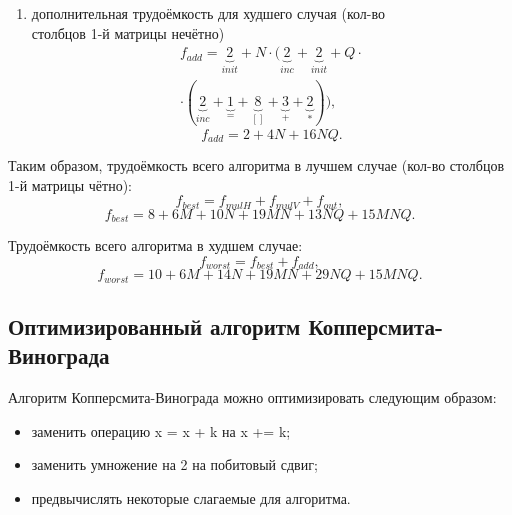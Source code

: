 \begin{enumerate}
	\item дополнительная трудоёмкость для худшего случая (кол-во\\
		столбцов 1-й матрицы нечётно)
	\begin{equation}
	\begin{gathered}
		f_{add} = \underbrace{2}_{init} + N \cdot (\underbrace{2}_{inc} + \underbrace{2}_{init} + Q \cdot \\
		\cdot (\underbrace{2}_{inc} + \underbrace{1}_{=} + \underbrace{8}_{[]} + \underbrace{3}_{+} + \underbrace{2}_{*})),
	\end{gathered}
	\end{equation}
	\begin{equation}
		f_{add} = 2 + 4N + 16NQ.
	\end{equation}
\end{enumerate}

\clearpage
Таким образом, трудоёмкость всего алгоритма в лучшем случае (кол-во столбцов 1-й матрицы чётно):
\begin{equation}
	f_{best} = f_{mulH} + f_{mulV} + f_{out},
\end{equation}
\begin{equation}
	f_{best} = 8 + 6M + 10N + 19MN + 13 NQ + 15 MNQ.
\end{equation}

Трудоёмкость всего алгоритма в худшем случае:
\begin{equation}
	f_{worst} = f_{best} + f_{add},
\end{equation}
\begin{equation}
	f_{worst} = 10 + 6M + 14N + 19MN + 29NQ + 15 MNQ.
\end{equation}

\subsection{Оптимизированный алгоритм \newline Копперсмита-Винограда}

Алгоритм Копперсмита-Винограда можно оптимизировать следующим образом:
\begin{itemize}
	\item заменить операцию x = x + k на x += k;
	\item заменить умножение на 2 на побитовый сдвиг;
	\item предвычислять некоторые слагаемые для алгоритма.
\end{itemize}

